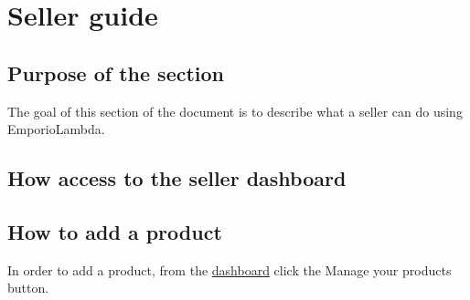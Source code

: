 \section{Seller guide} \label{_venditore}
\subsection{Purpose of the section}
The goal of this section of the document is to describe what a seller can do using EmporioLambda.

\subsection{How access to the seller dashboard} \label{_dashboard}

\subsection{How to add a product}
In order to add a product, from the \hyperref[_dashboard]{dashboard} click the Manage your products button.
